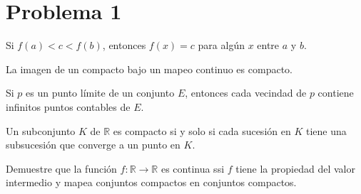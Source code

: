 \section{Problema 1}
\begin{tcolorbox}[colback=blue!15,colframe=blue!1!blue,title=Definición del valor intermedio]
Si $f(a)<c<f(b)$, entonces $f(x)=c$ para algún $x$ entre $a$ y $b$. 
\end{tcolorbox}


\begin{tcolorbox}[colback=gray!15,colframe=gray!1!gray,title=Teorema 1 (Demostrado en clase)]
La imagen de un compacto bajo un mapeo continuo es compacto.
\end{tcolorbox}
\begin{tcolorbox}[colback=blue!15,colframe=blue!1!blue,title=Definición de punto límite de \cite{rudin1976principles}]
	Si $p$ es un punto límite de un conjunto $E$, entonces cada vecindad de $p$ contiene infinitos puntos contables de $E$. 
\end{tcolorbox}

\begin{tcolorbox}[colback=gray!15,colframe=gray!1!gray,title=Caracterización secuencial de compacto (Demostrado en clase)]
	Un subconjunto $K$ de $\mathbb{R}$ es compacto si y solo si cada sucesión en $K$ tiene una subsucesión que converge a un punto en $K$.
\end{tcolorbox}

Demuestre que la función $f: \mathbb{R} \to \mathbb{R}$ es continua ssi $f$ tiene la propiedad del valor intermedio y mapea conjuntos compactos en conjuntos compactos.

